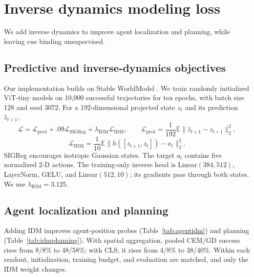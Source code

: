 \section{Inverse dynamics modeling loss}
\label{app:ablations}

We add inverse dynamics to improve agent localization and planning, while
leaving cue binding unsupervised.

\subsection{Predictive and inverse-dynamics objectives}

Our implementation builds on Stable WorldModel \citep{maes2026stableworldmodel}.
We train randomly initialized ViT-tiny models on 10,000 successful
trajectories for ten epochs, with batch size 128 and seed 3072. For a
192-dimensional projected state $z_t$ and its prediction $\hat z_{t+1}$,
\[
\mathcal L=\mathcal L_{\mathrm{pred}}+.09\mathcal L_{\mathrm{SIGReg}}
+\lambda_{\mathrm{IDM}}\mathcal L_{\mathrm{IDM}},\qquad
\mathcal L_{\mathrm{pred}}=\frac{1}{192}\mathbb E\|\hat z_{t+1}-z_{t+1}\|_2^2,
\]
\[
\mathcal L_{\mathrm{IDM}}=\frac{1}{10}\mathbb E\|h([z_{t+1},z_t])-a_t\|_2^2.
\]
SIGReg encourages isotropic Gaussian states. The target $a_t$ contains five
normalized 2-D actions. The training-only inverse head is
Linear$(384,512)$, LayerNorm, GELU, and Linear$(512,10)$; its gradients pass
through both states. We use $\lambda_{\mathrm{IDM}}=3.125$.

\subsection{Agent localization and planning}

Adding IDM improves agent-position probes (Table~\ref{tab:agentidm}) and
planning (Table~\ref{tab:idmplanning}). With spatial aggregation, pooled
CEM/GD success rises from 8/8\% to 48/58\%; with CLS, it rises from 4/8\%
to 38/40\%. Within each readout, initialization, training budget, and
evaluation are matched, and only the IDM weight changes.

